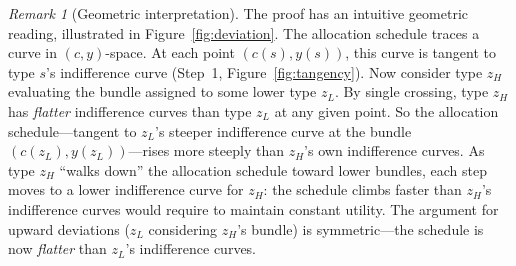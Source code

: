 \documentclass[12pt,a4paper]{article}
\theoremstyle{definition}
\theoremstyle{plain}
\theoremstyle{remark}
\newtheorem{remark}{Remark}[section]
\begin{document}
\begin{remark}[Geometric interpretation]
The proof has an intuitive geometric reading, illustrated in Figure~\ref{fig:deviation}. The allocation schedule traces a curve in $(c,y)$-space. At each point $(c(s), y(s))$, this curve is tangent to type $s$'s indifference curve (Step~1, Figure~\ref{fig:tangency}). Now consider type $z_H$ evaluating the bundle assigned to some lower type $z_L$. By single crossing, type $z_H$ has \emph{flatter} indifference curves than type $z_L$ at any given point. So the allocation schedule---tangent to $z_L$'s steeper indifference curve at the bundle $(c(z_L), y(z_L))$---rises more steeply than $z_H$'s own indifference curves. As type $z_H$ ``walks down'' the allocation schedule toward lower bundles, each step moves to a lower indifference curve for $z_H$: the schedule climbs faster than $z_H$'s indifference curves would require to maintain constant utility. The argument for upward deviations ($z_L$ considering $z_H$'s bundle) is symmetric---the schedule is now \emph{flatter} than $z_L$'s indifference curves.
\end{remark}
\end{document}
